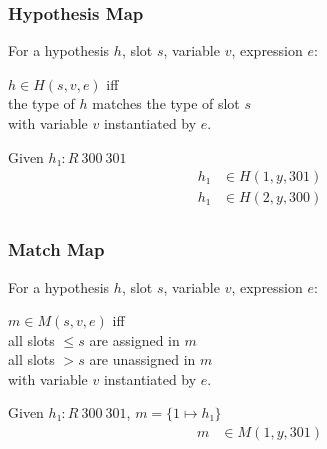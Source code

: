 \documentclass[xetex]{beamer}
\begin{document}
\begin{frame}
  \frametitle{Hypothesis Map}

  For a hypothesis $h$, slot $s$, variable $v$, expression $e$:

  $h ∈ H(s, v, e)$ iff \\
  the type of $h$ matches the type of slot $s$ \\
  with variable $v$ instantiated by $e$.

  \begin{example}
    Given $h₁ : R~300~301$
    \begin{align*}
      h₁ &∈ H(1, y, 301) \\
      h₁ &∈ H(2, y, 300) \\
    \end{align*}
  \end{example}
\end{frame}

\begin{frame}
  \frametitle{Match Map}

  For a hypothesis $h$, slot $s$, variable $v$, expression $e$:

  $m ∈ M(s, v, e)$ iff \\
  all slots $≤ s$ are assigned in $m$ \\
  all slots $> s$ are unassigned in $m$ \\
  with variable $v$ instantiated by $e$.

  \begin{example}
    Given $h₁ : R~300~301$, $m = \{1 ↦ h₁\}$
    \begin{align*}
      m &∈ M(1, y, 301) \\
    \end{align*}
  \end{example}
\end{frame}
\end{document}
